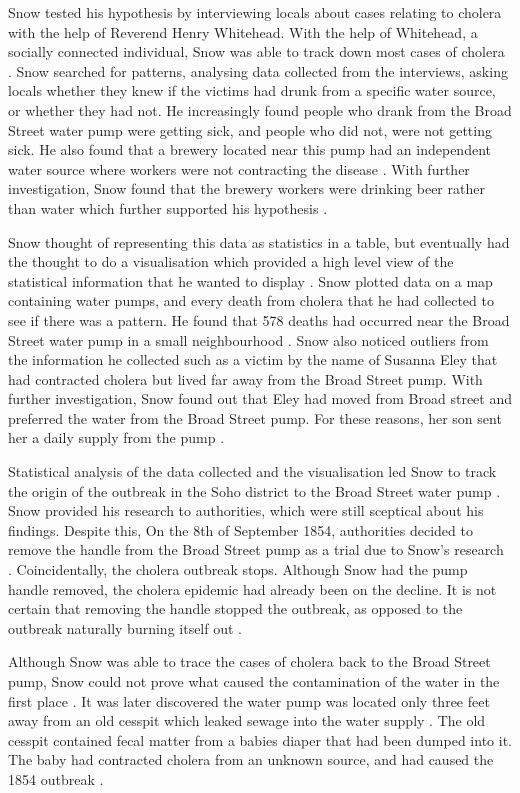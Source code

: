 \documentclass[12pt]{article}
\begin{document}
Snow tested his hypothesis by interviewing locals about cases relating to cholera with the help of Reverend Henry Whitehead. With the help of Whitehead, a socially connected individual, Snow was able to track down most cases of cholera \cite{tedtalk}. Snow searched for patterns, analysing data collected from the interviews, asking locals whether they knew if the victims had drunk from a specific water source, or whether they had not. He increasingly found people who drank from the Broad Street water pump were getting sick, and people who did not, were not getting sick. He also found that a brewery located near this pump had an independent water source where workers were not contracting the disease \cite{blog}. With further investigation, Snow found that the brewery workers were drinking beer rather than water which further supported his hypothesis \cite{youtube}.

Snow thought of representing this data as statistics in a table, but eventually had the thought to do a visualisation which provided a high level view of the statistical information that he wanted to display \cite{tedtalk}. Snow plotted data on a map containing water pumps, and every death from cholera that he had collected to see if there was a pattern. He found that 578 deaths had occurred near the Broad Street water pump in a small neighbourhood \cite{channel1}. Snow also noticed outliers from the information he collected such as a victim by the name of Susanna Eley that had contracted cholera but lived far away from the Broad Street pump. With further investigation, Snow found out that Eley had moved from Broad street and preferred the water from the Broad Street pump. For these reasons, her son sent her a daily supply from the pump \cite{channel1}. 

Statistical analysis of the data collected and the visualisation led Snow to track the origin of the outbreak in the Soho district to the Broad Street water pump \cite{test}.
Snow provided his research to authorities, which were still sceptical about his findings. Despite this, On the 8th of September 1854, authorities decided to remove the handle from the Broad Street pump as a trial due to Snow's research \cite{ucla, youtube}. Coincidentally, the cholera outbreak stops. Although Snow had the pump handle removed, the cholera epidemic had already been on the decline. It is not certain that removing the handle stopped the outbreak, as opposed to the outbreak naturally burning itself out \cite{original}.

Although Snow was able to trace the cases of cholera back to the Broad Street pump, Snow could not prove what caused the contamination of the water in the first place \cite{ucla}. It was later discovered the water pump was located only three feet away from an old cesspit which leaked sewage into the water supply \cite{channel1, heros}. The old cesspit contained fecal matter from a babies diaper that had been dumped into it. The baby had contracted cholera from an unknown source, and had caused the 1854 outbreak \cite{heros, tedtalk, johnson}. 
\end{document}
